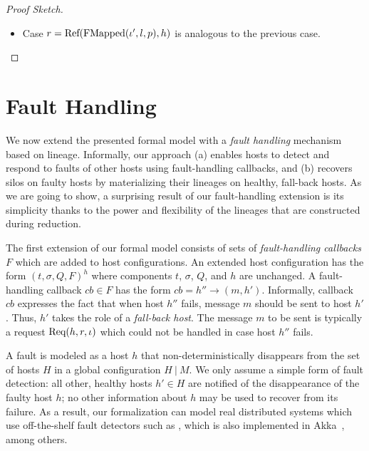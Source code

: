 \begin{proof}[Proof Sketch]
\begin{itemize}
    \item Case $r = {\textrm{Ref}(\textrm{FMapped}(\iota', l, p), h)}$ is analogous to
      the previous case.
  \end{itemize}
\end{proof}


\section{Fault Handling}\label{sec:formal-fault-handling}

We now extend the presented formal model with a {\em fault handling}
mechanism based on lineage. Informally, our approach (a) enables hosts
to detect and respond to faults of other hosts using fault-handling
callbacks, and (b) recovers silos on faulty hosts by materializing
their lineages on healthy, fall-back hosts. As we are going to show, a
surprising result of our fault-handling extension is its simplicity
thanks to the power and flexibility of the lineages that are
constructed during reduction.

The first extension of our formal model consists of sets of {\em
  fault-handling callbacks} $F$ which are added to host
configurations. An extended host configuration has the form $(t,
\sigma, Q, F)^h$ where components $t$, $\sigma$, $Q$, and $h$ are
unchanged. A fault-handling callback $cb \in F$ has the form $cb = h''
\rightarrow (m, h')$. Informally, callback $cb$ expresses the fact
that when host $h''$ fails, message $m$ should be sent to host
$h'$. Thus, $h'$ takes the role of a {\em fall-back host}. The message
$m$ to be sent is typically a request ${\textrm{Req}(h, r, \iota)}$ which could
not be handled in case host $h''$ fails.

A fault is modeled as a host $h$ that non-deterministically disappears
from the set of hosts $H$ in a global configuration $H~|~M$. We only
assume a simple form of fault detection: all other, healthy hosts $h'
\in H$ are notified of the disappearance of the faulty host $h$; no
other information about $h$ may be used to recover from its
failure. As a result, our formalization can model real distributed
systems which use off-the-shelf fault detectors such as
\cite{Hayashibara04}, which is also implemented in Akka~\cite{Akka},
among others.

